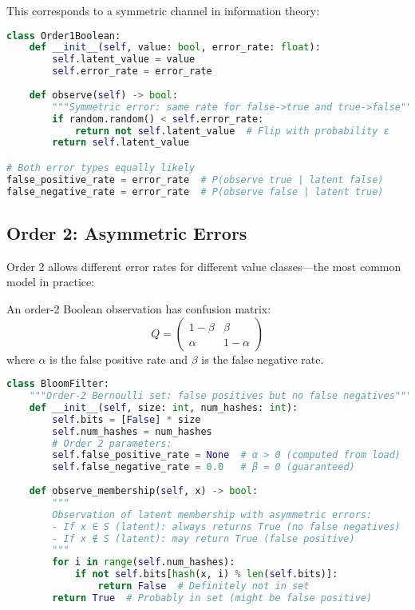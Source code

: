 This corresponds to a symmetric channel in information theory:

\begin{lstlisting}[language=Python, caption={Order 1: Symmetric error model}]
class Order1Boolean:
    def __init__(self, value: bool, error_rate: float):
        self.latent_value = value
        self.error_rate = error_rate
    
    def observe(self) -> bool:
        """Symmetric error: same rate for false->true and true->false"""
        if random.random() < self.error_rate:
            return not self.latent_value  # Flip with probability ε
        return self.latent_value

# Both error types equally likely
false_positive_rate = error_rate  # P(observe true | latent false)
false_negative_rate = error_rate  # P(observe false | latent true)
\end{lstlisting}

\subsection{Order 2: Asymmetric Errors}

Order 2 allows different error rates for different value classes—the most common model in practice:

\begin{definition}
An order-2 Boolean observation has confusion matrix:
\begin{equation}
Q = \begin{pmatrix}
1-\beta & \beta \\
\alpha & 1-\alpha
\end{pmatrix}
\end{equation}
where $\alpha$ is the false positive rate and $\beta$ is the false negative rate.
\end{definition}

\begin{lstlisting}[language=Python, caption={Order 2: Bloom filter with asymmetric errors}]
class BloomFilter:
    """Order-2 Bernoulli set: false positives but no false negatives"""
    def __init__(self, size: int, num_hashes: int):
        self.bits = [False] * size
        self.num_hashes = num_hashes
        # Order 2 parameters:
        self.false_positive_rate = None  # α > 0 (computed from load)
        self.false_negative_rate = 0.0   # β = 0 (guaranteed)
    
    def observe_membership(self, x) -> bool:
        """
        Observation of latent membership with asymmetric errors:
        - If x ∈ S (latent): always returns True (no false negatives)
        - If x ∉ S (latent): may return True (false positive)
        """
        for i in range(self.num_hashes):
            if not self.bits[hash(x, i) % len(self.bits)]:
                return False  # Definitely not in set
        return True  # Probably in set (might be false positive)
\end{lstlisting}

